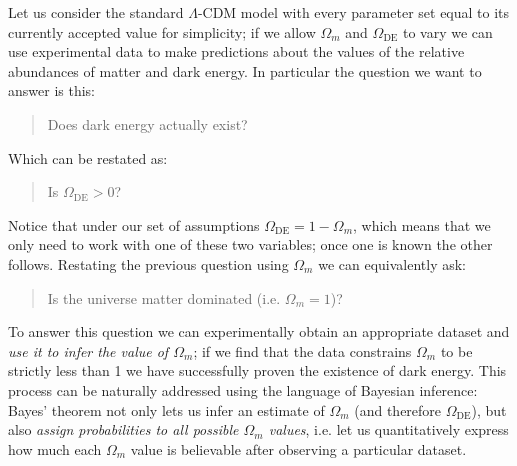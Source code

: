 Let us consider the standard $\Lambda$-CDM model with every parameter set equal to its currently accepted value for simplicity; if we allow $\Omega_m$ and $\Omega_{\text{DE}}$ to vary we can use experimental data to make predictions about the values of the relative abundances of matter and dark energy. In particular the question we want to answer is this:
\begin{quote}
    Does dark energy actually exist?
\end{quote}
Which can be restated as:
\begin{quote}
    Is $\Omega_{\text{DE}}>0$?
\end{quote}
Notice that under our set of assumptions $\Omega_{\text{DE}} = 1 - \Omega_m$, which means that we only need to work with one of these two variables; once one is known the other follows.
Restating the previous question using $\Omega_m$ we can equivalently ask:
\begin{quote}
    Is the universe matter dominated (i.e. $\Omega_m = 1$)?
\end{quote}
To answer this question we can experimentally obtain an appropriate dataset and \emph{use it to infer the value of $\Omega_m$}; if we find that the data constrains $\Omega_m$ to be strictly less than 1 we have successfully proven the existence of dark energy. This process can be naturally addressed using the language of Bayesian inference: Bayes' theorem not only lets us infer an estimate of $\Omega_m$ (and therefore $\Omega_{\text{DE}}$), but also \emph{assign probabilities to all possible $\Omega_m$ values}, i.e. let us quantitatively express how much each $\Omega_m$ value is believable after observing a particular dataset.

